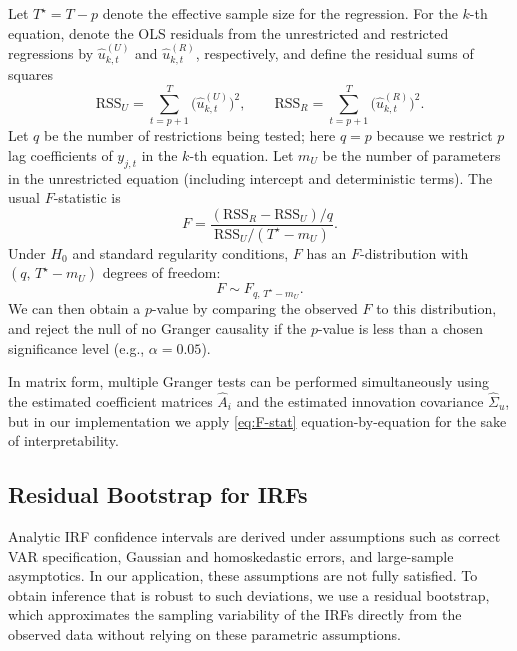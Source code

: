 \documentclass[11pt]{article}
\begin{document}
Let $T^\star = T - p$ denote the effective sample size for the regression.
For the $k$-th equation, denote the OLS residuals from the unrestricted and
restricted regressions by $\widehat{u}_{k,t}^{(U)}$ and
$\widehat{u}_{k,t}^{(R)}$, respectively, and define the residual sums of
squares
\begin{equation}
  \mathrm{RSS}_U = \sum_{t=p+1}^T \big(\widehat{u}_{k,t}^{(U)}\big)^2,
  \qquad
  \mathrm{RSS}_R = \sum_{t=p+1}^T \big(\widehat{u}_{k,t}^{(R)}\big)^2.
\end{equation}
Let $q$ be the number of restrictions being tested; here $q = p$ because
we restrict $p$ lag coefficients of $y_{j,t}$ in the $k$-th equation.
Let $m_U$ be the number of parameters in the unrestricted equation
(including intercept and deterministic terms).
The usual $F$-statistic is
\begin{equation}
  F
  = \frac{
      (\mathrm{RSS}_R - \mathrm{RSS}_U) / q
    }{
      \mathrm{RSS}_U / (T^\star - m_U)
    }.
  \label{eq:F-stat}
\end{equation}
Under $H_0$ and standard regularity conditions, $F$ has an $F$-distribution
with $(q,\, T^\star - m_U)$ degrees of freedom:
\begin{equation}
  F \sim F_{q,\, T^\star - m_U}.
\end{equation}
We can then obtain a $p$-value by comparing the observed $F$ to this distribution,
and reject the null of no Granger causality if the $p$-value is less than
a chosen significance level (e.g., $\alpha = 0.05$).

In matrix form, multiple Granger tests can be performed simultaneously
using the estimated coefficient matrices $\widehat{A}_i$ and the estimated
innovation covariance $\widehat{\Sigma}_u$, but in our implementation we
apply \cref{eq:F-stat} equation-by-equation for the sake of interpretability.  

\subsection{Residual Bootstrap for IRFs}
\label{app:bootstrap-irf}


Analytic IRF confidence intervals are derived under assumptions such as
correct VAR specification, Gaussian and homoskedastic errors, and large-sample
asymptotics. In our application, these assumptions are not fully satisfied.
To obtain inference that is robust to such deviations, we use a residual
bootstrap, which approximates the sampling variability of the IRFs directly
from the observed data without relying on these parametric assumptions.
\end{document}
